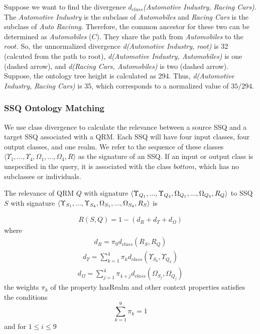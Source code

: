 Suppose we want to find the divergence $d_{class}$\textit{(Automotive
  Industry, Racing Cars)}. The \textit{Automotive Industry} is the
subclass of \textit{Automobiles} and \textit{Racing Cars} is the
subclass of \textit{Auto Racinng}. Therefore, the common ancestor for
these two can be determined as \textit{Automobiles} ($C$). They share
the path from \textit{Automobiles} to the $root$. So, the unnormalized
divergence \textit{d(Automotive Industry, root)} is 32 (calcuted from
the path to root), \textit{d(Automotive Industry, Automobiles)} is one
(dashed arrow), and \textit{d(Racing Cars, Automobiles)} is two
(dashed arrow). Suppose, the ontology tree height is calculated as
294. Thus, \textit{d(Automotive Industry, Racing Cars)} is 35, which
corresponds to a normalized value of $35/294$.

\subsubsection{SSQ Ontology Matching}
\label{sec:oqom}

We use class divergence to calculate the relevance between a source
SSQ and a target SSQ associated with a QRM.  Each SSQ will have four
input classes, four output classes, and one realm.  We refer to the
sequence of these classes $\langle \Upsilon_1, ..., \Upsilon_4,
\Omega_1, ..., \Omega_4, R \rangle$ as the signature of an SSQ. If an
input or output class is unspecified in the query, it is associated
with the class $bottom$, which has no subclasses or individuals.

The relevance of QRM $Q$ with signature $\langle \Upsilon_{Q_1}, ...,
\Upsilon_{Q_4}, \\\Omega_{Q_1}, ... , \Omega_{Q_4}, R_Q\rangle$ to SSQ
$S$ with signature $\langle \Upsilon_{S_1}, ..., \Upsilon_{S_4},
\\\Omega_{S_1}, ... , \Omega_{S_4}, R_S \rangle$ is

\begin{eqnarray}
\label{qrmsimilarity}
 R(S,Q) = 1 - (d_{R} + d_{\Upsilon} + d_{\Omega})
\end{eqnarray}
\noindent where 
\begin{eqnarray}
d_{R} = \pi_9 d_{class}(R_S,R_Q) \nonumber
\end{eqnarray}
\begin{eqnarray}
d_{\Upsilon}  = \sum_{k=1}^4 {\pi_k} {d_{class}(\Upsilon_{S_k},\Upsilon_{Q_k})} \nonumber
\end{eqnarray}
\begin{eqnarray}
 d_{\Omega} = \sum_{j=1}^4 \pi_{4+j} d_{class}(\Omega_{S_j},\Omega_{Q_j})  \nonumber
\end{eqnarray}
\noindent the weights ${\pi}_k$ of the property hasRealm and other context properties satisfies the conditions 
\begin{equation}
\label{piconstraint1}
\sum_{k=1}^{9} {{\pi}_k} = 1
\end{equation}
\noindent and for $1 \leq i \leq 9$

